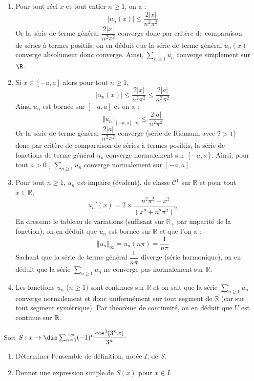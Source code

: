 \documentclass[a4paper,10pt]{report}
\newcommand{\Sum}[2]{\ensuremath{\textstyle{\sum\limits_{#1}^{#2}}}}
\begin{document}
\corr \begin{enumerate}
\item Pour tout réel $x$ et tout entier $n \geq 1$, on a :
$$\left| u_{n}\left( x\right) \right| \leq 
\frac{2\left| x\right| }{n^{2}\pi ^{2}}$$
Or la s\'{e}rie de terme g\'{e}n\'{e}ral $\dfrac{2\left| x\right| }{n^{2}\pi ^{2}}$ converge donc par critère de comparaison de séries à termes positifs, on en déduit que la série de terme général $u_{n}\left( x\right) $ converge absolument donc converge. Ainsi, $\Sum{n \geq 1}{} u_n$ converge simplement sur $\R$.
\item Si $x\in \left[ -a,a\right] $ alors pour tout $n \geq 1$, 
$$\left| u_{n}\left( x\right) \right| \leq \frac{2\left| x\right| }{n^{2}\pi ^{2}}\leq \frac{2\left|
a\right| }{n^{2}\pi ^{2}}$$
Ainsi $u_n$ est bornée sur $[-a,a]$ et on a :
$$ \Vert u_n \Vert_{[-a,a], \infty} \leq  \frac{2\left|a\right| }{n^{2}\pi ^{2}}$$
Or la s\'{e}rie de terme g\'{e}n\'{e}ral $\dfrac{2\left| a\right| }{n^{2}\pi ^{2}}$ converge (série de Riemann avec $2>1$) donc par critère de comparaison de séries à termes positifs, la série de fonctions de terme général $u_n$ converge normalement sur $[-a,a]$. Ainsi, pour tout $a > 0$ , $\Sum{n \geq 1}{} u_n$ converge normalement sur $[-a,a]$.
\item Pour tout $n \geq 1$, $u_n$ est impaire (évident), de classe $\mathcal{C}^1$ sur $\mathbb{R}$ et pour tout $x \in \mathbb{R}$,
$$u_n'(x) = 2 \times \frac{n^2\pi^2-x^2}{(x^2+n^2 \pi^2)^2}$$
En dressant le tableau de variations (suffisant sur $\mathbb{R}_+$ par imparité de la fonction), on en déduit que $u_n$ est bornée sur $\mathbb{R}$ et que l'on a :
$$ \Vert u_n \Vert_{\infty} = u_n( n \pi) = \frac{1}{n \pi}$$
Sachant que la série de terme général $\dfrac{1}{n\pi}$ diverge (série harmonique), on en déduit que la s\'{e}rie $\Sum{n \geq 1}{} u_{n}$ ne converge pas normalement sur $\mathbb{R}$.
\item Les fonctions $u_{n}$ ($n \geq 1$) sont continues sur $\mathbb{R}$ et on sait que la s\'{e}rie $\Sum{n \geq 1}{} u_{n}$ converge normalement et donc uniformément sur tout segment de $\mathbb{R}$ (car sur tout segment symétrique). Par théorème de continuité, on en déduit que $U$ est continue sur $\Bbb{R}$.
\end{enumerate}

\begin{Exa} Soit $S : x \mapsto \dis \sum_{n=0}^{+ \infty}  (-1)^n \dfrac{\cos^3(3^nx)}{3^n} \cdot$

\begin{enumerate}
\item Déterminer l'ensemble de définition, notée $I$, de $S$.
\item Donner une expression simple de $S(x)$ pour $x \in I$.
\end{enumerate}
\end{Exa}
\end{document}

